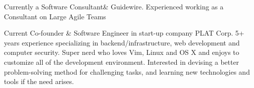

\begin{cvparagraph}


Currently a Software Consultant\& Guidewire. Experienced working as a Consultant on Large Agile Teams

Current Co-founder \& Software Engineer in start-up company PLAT Corp. 5+ years experience specializing in backend/infrastructure, web development and computer security. Super nerd who loves Vim, Linux and OS X and enjoys to customize all of the development environment. Interested in devising a better problem-solving method for challenging tasks, and learning new technologies and tools if the need arises.
\end{cvparagraph}
